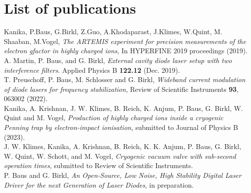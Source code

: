 \documentclass[12pt]{book}
\begin{document}
\chapter*{List of publications}

Kanika, P.Baus, G.Birkl, Z.Guo, A.Khodaparast, J.Klimes, W.Quint, M. Shaaban, M.Vogel, \textit{The ARTEMIS experiment for precision measurements of the electron gfactor in highly charged ions}, In HYPERFINE 2019 proceedings (2019).\\

A. Martin, P. Baus, and G. Birkl, \textit{External cavity diode laser setup
with two interference filters}. Applied Physics B \textbf{122.12} (Dec. 2019).\\

T. Preuschoff, P. Baus, M. Schlosser and G. Birkl, \textit{Wideband current modulation of diode lasers for frequency stabilization}, Review of Scientific Instruments \textbf{93}, 063002 (2022).\\

Kanika, A. Krishnan, J. W. Klimes, B. Reich, K. Anjum, P. Baus, G. Birkl, W. Quint and M. Vogel, \textit{Production of highly charged ions inside a cryogenic
Penning trap by electron-impact ionisation}, submitted to Journal of Physics B (2023).\\

J. W. Klimes, Kanika, A. Krishnan, B. Reich, K. K. Anjum, P. Baus, G. Birkl, W. Quint, W. Schott, and M. Vogel, \textit{Cryogenic vacuum valve with sub-second operation times}, submitted to Review of Scientific Instruments.\\

P. Baus and G. Birkl, \textit{An Open-Source, Low Noise, High Stability Digital Laser Driver for the next
Generation of Laser Diodes}, in preparation.
\end{document}
